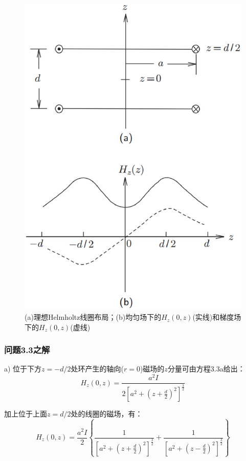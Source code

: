 \begin{figure}[htbp]
	\centering
	\includegraphics[scale=0.4]{chpt3/figs/fig3.24.eps}
	\caption{(a)理想Helmholtz线圈布局；(b)均匀场下的$H_z(0,z)$(实线)和梯度场下的$H_z(0,z)$(虚线)}
\end{figure}

\subsubsection{问题3.3之解}
a) 位于下方$z=−d/2$处环产生的轴向($r =0$)磁场的$z$分量可由方程3.3a给出：
\begin{equation*}%
H_z(0,z)=\frac{a^2I}{2[a^2+(z+\frac{d}{2})^2]^\frac{3}{2}}
\end{equation*}

加上位于上面$z=d/2$处的线圈的磁场，有：
\begin{equation*}%
H_z(0,z)=\frac{a^2I}{2}\left\{\frac{1}{[a^2+(z+\frac{d}{2})^2]^\frac{3}{2}}+\frac{1}{[a^2+(z-\frac{d}{2})^2]^\frac{3}{2}}\right\} \tag{S3.1}
\end{equation*}

